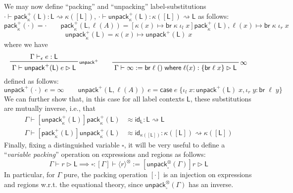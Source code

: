 \documentclass[acmsmall,screen,review]{acmart}
\newcommand{\ms}[1]{\ensuremath{\mathsf{#1}}}
\newcommand{\lto}{:}
\newcommand{\linl}[1]{\iota_l\;{#1}}
\newcommand{\linr}[1]{\iota_r\;{#1}}
\newcommand{\brb}[2]{\ms{br}\;#1\;#2}
\newcommand{\casestmt}[5]{\ms{case}\;#1\;\{\linl{#2} \lto #3, \linr{#4} \lto #5\}}
\newcommand{\where}[2]{#1\;\ms{where}\;#2}
\newcommand{\wbranch}[3]{#1(#2) \lto \{#3\}}
\newcommand{\rle}[1]{{\scriptsize\textsf{#1}}}
\newcommand{\hasty}[4]{#1 \vdash_{#2} #3: {#4}}
\newcommand{\haslb}[3]{#1 \vdash #2 \rhd #3}
\newcommand{\lbsubst}[4]{#1 \vdash #2: #3 \rightsquigarrow #4}
\newcommand{\teqv}{\approx}
\newcommand{\invar}{\square}
\newcommand{\pckd}[1]{\langle #1 \rangle}
\begin{document}
We may now define ``packing'' and ``unpacking'' label-substitutions
$\lbsubst{\cdot}{\ms{pack}_\kappa^+(\ms{L})}{\ms{L}}{\kappa([\ms{L}])}$,
$\lbsubst{\cdot}{\ms{unpack}_\kappa^+(\ms{L})}{\kappa([\ms{L}])}{\ms{L}}$ as follows:
\begin{equation}
  \ms{pack}_\kappa^+(\cdot) = \cdot \qquad
  \ms{pack}_\kappa^+(\ms{L}, \ell(A)) 
  = [\kappa(x) \mapsto \brb{\kappa}{\iota_l\;x}]\ms{pack}_\kappa^+(\ms{L}), 
    \ell(x) \mapsto \brb{\kappa}{\iota_r\;x}  
\end{equation}
\begin{equation}
  \ms{unpack}_\kappa^+(\ms{L}) = \kappa(x) \mapsto \ms{unpack}^+(\ms{L})\;x
\end{equation}
where we have
\begin{equation}
  \prftree[r]{\rle{unpack$^+$}}
    {\hasty{\Gamma}{\epsilon}{e}{\ms{L}}}
    {\haslb{\Gamma}{\ms{unpack}^+(\ms{L})\;e}{\ms{L}}} \qquad
  \prftree[r]{$\infty$}
    {\haslb{\Gamma}{\infty := \where{\brb{\ell}{()}}{\wbranch{\ell}{x}{\brb{\ell}{x}}}}{\ms{L}}}
\end{equation}
defined as follows:
\begin{equation}
  \ms{unpack}^+(\cdot)\;e = \infty \qquad
  \ms{unpack}^+(\ms{L}, \ell(A))\;e = \casestmt{e}{x}{\ms{unpack}^+(\ms{L})\;x}{y}{\brb{\ell}{y}}
\end{equation}
We can further show that, in this case for all label contexts $\ms{L}$, these substitutions are
mutually inverse, i.e., that
\begin{equation}
  \begin{aligned}
  \lbsubst{\Gamma}
    {[\ms{unpack}_\kappa^+(\ms{L})]\ms{pack}_\kappa^+(\ms{L}) 
      &\teqv \ms{id}_{\ms{L}}}{\ms{L}}{\ms{L}}
  \\
  \lbsubst{\Gamma}
    {[\ms{pack}_\kappa^+(\ms{L})]\ms{unpack}_\kappa^+(\ms{L}) &\teqv \ms{id}_{\kappa([\ms{L}])}}
    {\kappa([\ms{L}])}{\kappa([\ms{L}])}
  \end{aligned}
\end{equation}
Finally, fixing a distinguished variable $\invar$, it will be very useful to define 
a ``\emph{variable packing}'' operation on expressions and regions as follows:
\begin{equation}
  \haslb{\Gamma}{r}{\ms{L}} \implies 
  \haslb{\invar : [\Gamma]}{\pckd{r}^\otimes := [\ms{unpack}_{\invar}^\otimes(\Gamma)]r}{\ms{L}}
\end{equation}
In particular, for $\Gamma$ pure, the packing operation $[\cdot]$ is an injection on expressions and
regions w.r.t. the equational theory, since $\ms{unpack}_{\invar}^\otimes(\Gamma)$ has an inverse.
\end{document}
